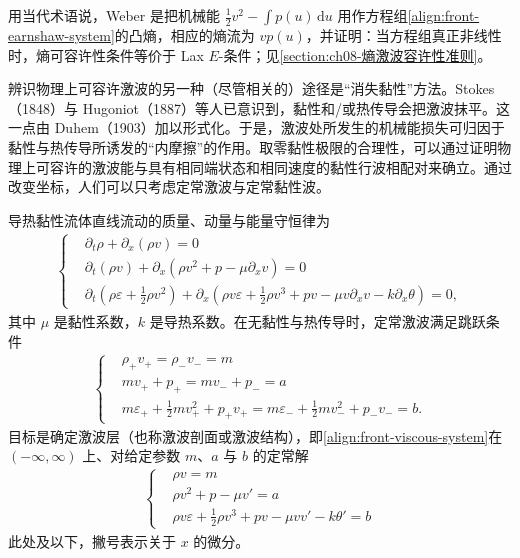 \documentclass[../../main.tex]{subfiles}
\begin{document}
用当代术语说，Weber 是把机械能 $\tfrac{1}{2}v^{2}-\int p(u)\,\mathrm{d}u$ 用作方程组\eqref{align:front-earnshaw-system}的凸熵，相应的熵流为 $vp(u)$，并证明：当方程组真正非线性时，熵可容许性条件等价于 Lax $E$-条件；见\cref{section:ch08-熵激波容许性准则}。

辨识物理上可容许激波的另一种（尽管相关的）途径是“消失黏性”方法。Stokes（1848）与 Hugoniot（1887）等人已意识到，黏性和/或热传导会把激波抹平。这一点由 Duhem（1903）加以形式化。于是，激波处所发生的机械能损失可归因于黏性与热传导所诱发的“内摩擦”的作用。取零黏性极限的合理性，可以通过证明物理上可容许的激波能与具有相同端状态和相同速度的黏性行波相配对来确立。通过改变坐标，人们可以只考虑定常激波与定常黏性波。

导热黏性流体直线流动的质量、动量与能量守恒律为
\begin{align}
\left\{\begin{aligned}
&\partial_t\rho+\partial_x(\rho v)=0\\
&\partial_t(\rho v)+\partial_x(\rho v^{2}+p-\mu\partial_x v)=0\\
&\partial_t\left(\rho\varepsilon+\frac{1}{2}\rho v^{2}\right)
+\partial_x\left(\rho v\varepsilon+\frac{1}{2}\rho v^{3}+pv-\mu v\partial_x v-k\partial_x\theta\right)=0,
\end{aligned}\right.\label{align:front-viscous-system}
\end{align}
其中 $\mu$ 是黏性系数，$k$ 是导热系数。在无黏性与热传导时，定常激波满足跳跃条件
\begin{align}
\left\{\begin{aligned}
&\rho_+v_+=\rho_-v_-=m\\
&mv_++p_+=mv_-+p_-=a\\
&m\varepsilon_++\frac{1}{2}mv_+^{2}+p_+v_+=m\varepsilon_-+\frac{1}{2}mv_-^{2}+p_-v_-=b.
\end{aligned}\right.\label{align:front-stationary-jump}
\end{align}
目标是确定激波层（也称激波剖面或激波结构），即\eqref{align:front-viscous-system}在 $(-\infty,\infty)$ 上、对给定参数 $m$、$a$ 与 $b$ 的定常解
\begin{align}
\left\{\begin{aligned}
&\rho v=m\\
&\rho v^{2}+p-\mu v'=a\\
&\rho v\varepsilon+\frac{1}{2}\rho v^{3}+pv-\mu vv'-k\theta'=b
\end{aligned}\right.\label{align:front-shock-profile}
\end{align}
此处及以下，撇号表示关于 $x$ 的微分。
\end{document}
